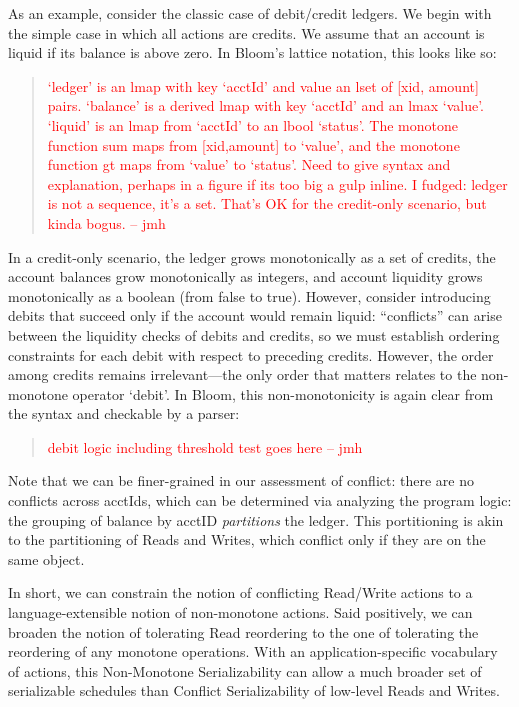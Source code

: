 \documentclass{sig-alternate}
\newcommand{\jmh}[1]{{\textcolor{red}{#1 -- jmh}}}
\begin{document}
As an example, consider the classic case of debit/credit ledgers.  We begin with the simple case in which all actions are credits. We assume that an account is liquid if its balance is above zero. In Bloom's lattice notation, this looks like so:
\begin{quote}
	\jmh{`ledger' is an lmap with key `acctId' and value an lset of [xid, amount] pairs.  `balance' is a derived lmap with key `acctId' and an lmax `value'.  `liquid' is an lmap from `acctId' to an lbool `status'.  The monotone function sum maps from [xid,amount] to `value', and the monotone function gt maps from `value' to `status'. Need to give syntax and explanation, perhaps in a figure if its too big a gulp inline.  I fudged:  ledger is not a sequence, it's a set.  That's OK for the credit-only scenario, but kinda bogus.}
\end{quote}
In a credit-only scenario, the ledger grows monotonically as a set of credits, the account balances grow monotonically as integers, and account liquidity grows monotonically as a boolean (from false to true).  However, consider introducing debits that succeed only if the account would remain liquid: ``conflicts'' can arise between the liquidity checks of debits and credits, so we must establish ordering constraints for each debit with respect to preceding credits.  However, the order among credits remains irrelevant---the only order that matters relates to the non-monotone operator `debit'.  In Bloom, this non-monotonicity is again clear from the syntax and checkable by a parser:
\begin{quote}
	\jmh{debit logic including threshold test goes here}
\end{quote}
Note that we can be finer-grained in our assessment of conflict: there are no conflicts across acctIds, which can be determined via analyzing the program logic: the grouping of balance by acctID \emph{partitions} the ledger.  This portitioning is akin to the partitioning of Reads and Writes, which conflict only if they are on the same object.

In short, we can constrain the notion of conflicting Read/Write actions to a language-extensible notion of non-monotone actions.  Said positively, we can broaden the notion of tolerating Read reordering to the one of tolerating the reordering of any monotone operations.  With an application-specific vocabulary of actions, this Non-Monotone Serializability can allow a much broader set of serializable schedules than Conflict Serializability of low-level Reads and Writes.
\end{document}
